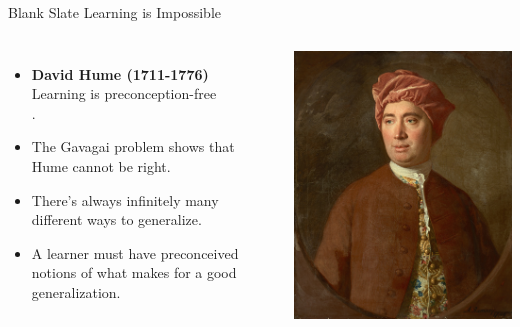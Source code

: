 \documentclass[xcolor={usenames,svgnames,x11names,dvipsnames,table}]{beamer}
\begin{document}
\begin{frame}{Blank Slate Learning is Impossible}
    \begin{columns}
        \begin{itemize}
            \item \textbf{David Hume (1711-1776)}\\
                    Learning is preconception-free\\
                    .
            \item The Gavagai problem shows that Hume cannot be right.
            \item There's always infinitely many different ways to generalize.
            \item A learner must have preconceived notions of what makes for a good generalization.
        \end{itemize}

        \includegraphics[width=1\linewidth]{./img/hume}
    \end{columns}
\end{frame}
\end{document}
